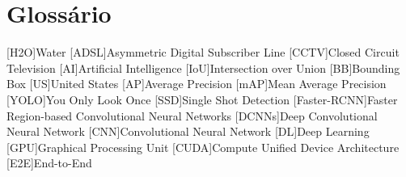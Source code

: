 \chapter{Glossário}

\footnotesize
\SingleSpacing

\begin{multicols}{2}
\begin{acronym}[AAAAAA]

	[H2O]{Water}
	[ADSL]{Asymmetric Digital Subscriber Line}
	[CCTV]{Closed Circuit Television}
	[AI]{Artificial Intelligence}
	[IoU]{Intersection over Union}
	[BB]{Bounding Box}
	[US]{United States}
	[AP]{Average Precision}
	[mAP]{Mean Average Precision}
	[YOLO]{You Only Look Once}
	[SSD]{Single Shot Detection}
	[Faster-RCNN]{Faster Region-based Convolutional Neural Networks}
	[DCNNs]{Deep Convolutional Neural Network}
	[CNN]{Convolutional Neural Network}
	[DL]{Deep Learning}
	[GPU]{Graphical Processing Unit}
	[CUDA]{Compute Unified Device Architecture}
	[E2E]{End-to-End}
\end{acronym}
\end{multicols}

